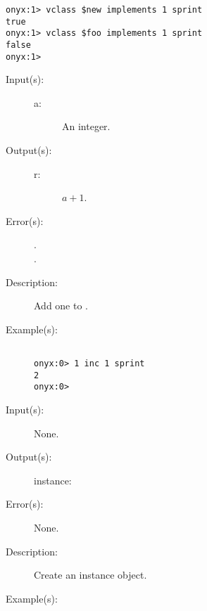 \begin{description}
\begin{description}
\begin{verbatim}
onyx:1> vclass $new implements 1 sprint
true
onyx:1> vclass $foo implements 1 sprint
false
onyx:1>
		\end{verbatim}
	\end{description}
\label{systemdict:inc}
\item[{\onyxop{a}{inc}{r}}: ]
	\begin{description}\item[]
	\item[Input(s): ]
		\begin{description}\item[]
		\item[a: ]
			An integer.
		\end{description}
	\item[Output(s): ]
		\begin{description}\item[]
		\item[r: ]
			$a + 1$.
		\end{description}
	\item[Error(s): ]
		\begin{description}\item[]
		\item[.]
		\item[.]
		\end{description}
	\item[Description: ]
		Add one to .
	\item[Example(s): ]\begin{verbatim}

onyx:0> 1 inc 1 sprint
2
onyx:0>
		\end{verbatim}
	\end{description}
\label{systemdict:instance}
\item[{\onyxop{--}{instance}{instance}}: ]
	\begin{description}\item[]
	\item[Input(s): ] None.
	\item[Output(s): ]
		\begin{description}\item[]
		\item[instance: ]
		\end{description}
	\item[Error(s): ] None.
	\item[Description: ]
		Create an instance object.
	\item[Example(s): ]\begin{verbatim}


\end{verbatim}
\end{description}
\end{description}
